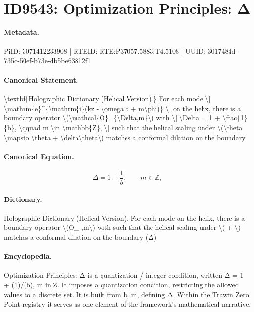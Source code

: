 \section*{ID9543: Optimization Principles: Δ}
\paragraph{Metadata.}
PiID: 3071412233908 | RTEID: RTE:P37057.5883:T4.5108 | UUID: 3017484d-735c-50ef-b73e-db5be63812f1

\paragraph{Canonical Statement.}
\textbackslash{}textbf\{Holographic Dictionary (Helical Version).\} For each mode \textbackslash{}[ \textbackslash{}mathrm\{e\}\textasciicircum{}\{\textbackslash{}mathrm\{i\}(kz - \textbackslash{}omega t + m\textbackslash{}phi)\} \textbackslash{}] on the helix, there is a boundary operator \textbackslash{}(\textbackslash{}mathcal\{O\}\_\{\textbackslash{}Delta,m\}\textbackslash{}) with \textbackslash{}[ \textbackslash{}Delta = 1 + \textbackslash{}frac\{1\}\{b\}, \textbackslash{}qquad m \textbackslash{}in \textbackslash{}mathbb\{Z\}, \textbackslash{}] such that the helical scaling under \textbackslash{}(\textbackslash{}theta \textbackslash{}mapsto \textbackslash{}theta + \textbackslash{}delta\textbackslash{}theta\textbackslash{}) matches a conformal dilation on the boundary.

\paragraph{Canonical Equation.}
\[
\Delta = 1 + \frac{1}{b}, \qquad m \in \mathbb{Z},
\]

\paragraph{Dictionary.}
Holographic Dictionary (Helical Version). For each mode on the helix, there is a boundary operator \textbackslash{}(O\_ ,m\textbackslash{}) with such that the helical scaling under \textbackslash{}( + \textbackslash{}) matches a conformal dilation on the boundary (Δ)

\paragraph{Encyclopedia.}
Optimization Principles: Δ is a quantization / integer condition, written Δ = 1 + (1)/(b), m in Z. It imposes a quantization condition, restricting the allowed values to a discrete set. It is built from b, m, defining Δ. Within the Trawin Zero Point registry it serves as one element of the framework's mathematical narrative.
